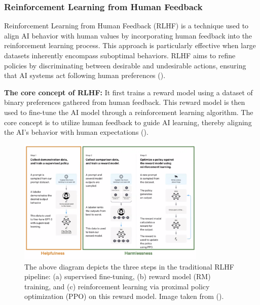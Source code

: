 \documentclass[
  letterpaper,
  DIV=11,
  numbers=noendperiod,
  oneside]{scrreprt}
\theoremstyle{remark}
\begin{document}
\subsubsection{Reinforcement Learning from Human
Feedback}\label{reinforcement-learning-from-human-feedback}

Reinforcement Learning from Human Feedback (RLHF) is a technique used to
align AI behavior with human values by incorporating human feedback into
the reinforcement learning process. This approach is particularly
effective when large datasets inherently encompass suboptimal behaviors.
RLHF aims to refine policies by discriminating between desirable and
undesirable actions, ensuring that AI systems act following human
preferences ().

\textbf{The core concept of RLHF:} It first trains a reward model using
a dataset of binary preferences gathered from human feedback. This
reward model is then used to fine-tune the AI model through a
reinforcement learning algorithm. The core concept is to utilize human
feedback to guide AI learning, thereby aligning the AI's behavior with
human expectations ().

\begin{figure}

{\centering \includegraphics[width=0.8\textwidth,height=\textheight]{Figures/rlhf.png}

}

\caption{The above diagram depicts the three steps in the traditional
RLHF pipeline: (a) supervised fine-tuning, (b) reward model (RM)
training, and (c) reinforcement learning via proximal policy
optimization (PPO) on this reward model. Image taken from
().}

\end{figure}%
\end{document}
